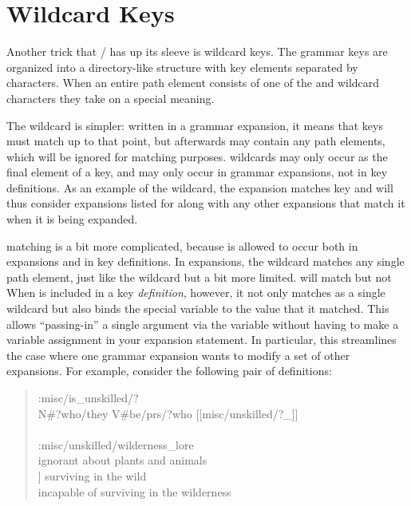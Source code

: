 \section{Wildcard Keys}

Another trick that \dunyazad/ has up its sleeve is wildcard keys.
%
The grammar keys are organized into a directory-like structure with key elements separated by \exchar{/} characters.
%
When an entire path element consists of one of the  and \exchar{*} wildcard characters they take on a special meaning.


The \exchar{*} wildcard is simpler: written in a grammar expansion, it means that keys must match up to that point, but afterwards may contain any path elements, which will be ignored for matching purposes.
%
\exchar{*} wildcards may only occur as the final element of a key, and may only occur in grammar expansions, not in key definitions.
%
As an example of the \exchar{*} wildcard, the expansion  matches key  and will thus consider expansions listed for  along with any other expansions that match it when it is being expanded.


 matching is a bit more complicated, because  is allowed to occur both in expansions and in key definitions.
%
In expansions, the  wildcard matches any single path element, just like the \exchar{*} wildcard but a bit more limited.
%
 will match  but not 
%
When  is included in a key \emph{definition}, however, it not only matches as a single wildcard but also binds the special variable \prq{\_}{} to the value that it matched.
%
This allows ``passing-in'' a single argument via the \prq{\_}{} variable without having to make a variable assignment in your expansion statement.
%
In particular, this streamlines the case where one grammar expansion wants to modify a set of other expansions.
%
For example, consider the following pair of definitions:

\begin{quote}
\ttfamily
:misc/is\_unskilled/? \\
N\#?who/they V\#be/prs/?who [[misc/unskilled/?\_]] \\
\\
:misc/unskilled/wilderness\_lore \\
ignorant about plants and animals \\ \relax
[[misc/bad\_at]] surviving in the wild \\
incapable of surviving in the wilderness
\end{quote}


